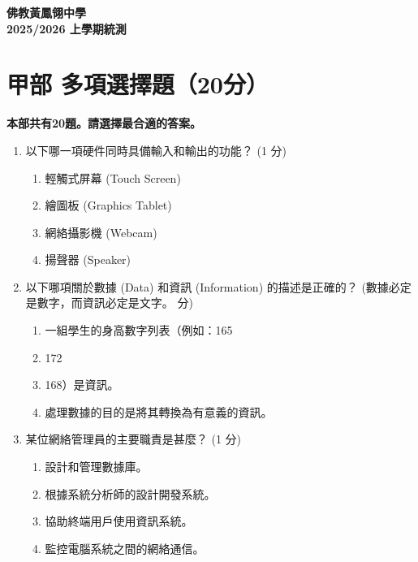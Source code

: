 \documentclass[12pt,a4paper]{article}
\begin{document}
\begin{center}
{\Large\bfseries 佛教黃鳳翎中學}\\[0.5em]
{\Large\bfseries 2025/2026 上學期統測}\\[1em]
\end{center}

\newpage

\section{\textbf{甲部 多項選擇題（20分）}}
\textbf{本部共有20題。請選擇最合適的答案。}

\begin{enumerate}

    \item 以下哪一項硬件同時具備輸入和輸出的功能？ (1 分)
    \begin{enumerate}[label=\Alph*.]
        \item 輕觸式屏幕 (Touch Screen)
        \item 繪圖板 (Graphics Tablet)
        \item 網絡攝影機 (Webcam)
        \item 揚聲器 (Speaker)
    \end{enumerate}
    
    \item 以下哪項關於數據 (Data) 和資訊 (Information) 的描述是正確的？ (數據必定是數字，而資訊必定是文字。 分)
    \begin{enumerate}[label=\Alph*.]
        \item 一組學生的身高數字列表（例如：165
        \item  172
        \item  168）是資訊。
        \item 處理數據的目的是將其轉換為有意義的資訊。
    \end{enumerate}
    
    \item 某位網絡管理員的主要職責是甚麼？ (1 分)
    \begin{enumerate}[label=\Alph*.]
        \item 設計和管理數據庫。
        \item 根據系統分析師的設計開發系統。
        \item 協助終端用戶使用資訊系統。
        \item 監控電腦系統之間的網絡通信。
    \end{enumerate}
    

\end{enumerate}
\end{document}
